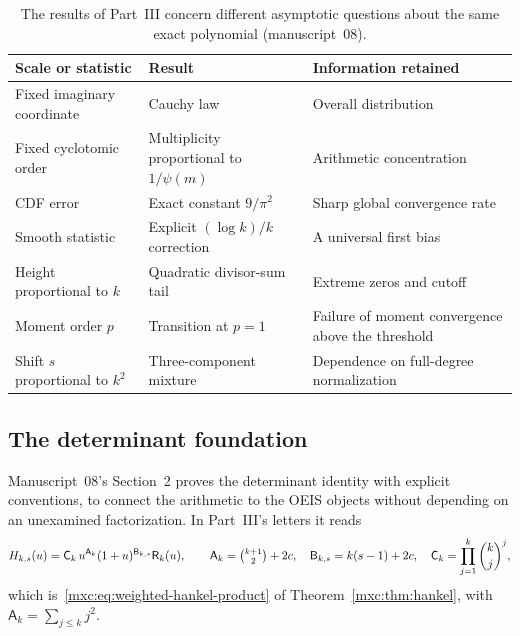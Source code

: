 \documentclass[11pt]{article}
\numberwithin{equation}{section}
\theoremstyle{definition}
\theoremstyle{remark}
\begin{document}
\begin{table}[htbp]
\centering\small
\begin{tabular}{@{}>{\raggedright\arraybackslash}p{}>{\raggedright\arraybackslash}p{}>{\raggedright\arraybackslash}p{}@{}}
\toprule
Scale or statistic & Result & Information retained\\
\midrule
Fixed imaginary coordinate & Cauchy law & Overall distribution\\
Fixed cyclotomic order & Multiplicity proportional to $1/\psi(m)$
 & Arithmetic concentration\\
CDF error & Exact constant $9/\pi^2$ & Sharp global convergence rate\\
Smooth statistic & Explicit $(\log k)/k$ correction & A universal first bias\\
Height proportional to $k$ & Quadratic divisor-sum tail
 & Extreme zeros and cutoff\\
Moment order $p$ & Transition at $p=1$
 & Failure of moment convergence above the threshold\\
Shift $s$ proportional to $k^2$ & Three-component mixture
 & Dependence on full-degree normalization\\
\bottomrule
\end{tabular}
\caption{The results of Part~III concern different asymptotic questions
about the same exact polynomial (manuscript~08).}
\label{mxc:hz:tab:roadmap}
\end{table}

\subsection{The determinant foundation}

Manuscript~08's Section~2 proves the determinant identity with explicit
conventions, to connect the arithmetic to the OEIS objects without
depending on an unexamined factorization. In Part~III's letters it reads
\begin{equation}\label{mxc:hz:eq:prior-product}
 H_{k,s}(u)=\mathsf C_k\,u^{\mathsf A_k}(1+u)^{\mathsf B_{k,s}}\mathsf R_k(u),
 \qquad
 \mathsf A_k=\tbinom{k+1}2+2c,\quad
 \mathsf B_{k,s}=k(s-1)+2c,\quad
 \mathsf C_k=\prod_{j=1}^k\binom kj^{j},
\end{equation}
which is~\eqref{mxc:eq:weighted-hankel-product} of
Theorem~\ref{mxc:thm:hankel}, with $\mathsf A_k=\sum_{j\le k}j^2$.
\end{document}
